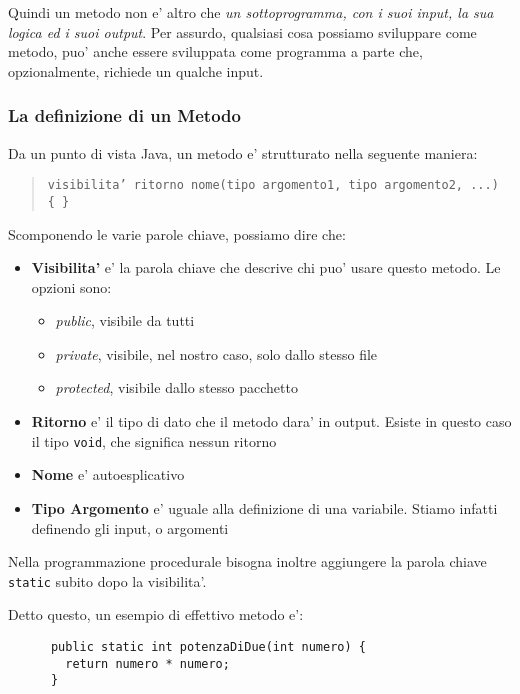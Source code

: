 \documentclass{article}
\begin{document}
{    Quindi un metodo non e' altro che \textit{un sottoprogramma, con i suoi input, la sua logica ed i suoi output}. Per assurdo, qualsiasi cosa possiamo sviluppare come metodo, puo' anche essere sviluppata come programma a parte che, opzionalmente, richiede un qualche input.

    \subsubsection{La definizione di un Metodo} %
    Da un punto di vista Java, un metodo e' strutturato nella seguente maniera:

    \begin{quote}
      \texttt{visibilita' ritorno nome(tipo argomento1, tipo argomento2, ...) \{ \}}
    \end{quote}

    Scomponendo le varie parole chiave, possiamo dire che:

    \begin{itemize}
      \item \textbf{Visibilita'} e' la parola chiave che descrive chi puo' usare questo metodo. Le opzioni sono:
      \begin{itemize}
        \item \textit{public}, visibile da tutti
        \item \textit{private}, visibile, nel nostro caso, solo dallo stesso file
        \item \textit{protected}, visibile dallo stesso pacchetto
      \end{itemize}
      \item \textbf{Ritorno} e' il tipo di dato che il metodo dara' in output. Esiste in questo caso il tipo \texttt{void}, che significa nessun ritorno
      \item \textbf{Nome} e' autoesplicativo
      \item \textbf{Tipo Argomento} e' uguale alla definizione di una variabile. Stiamo infatti definendo gli input, o argomenti
    \end{itemize}

    Nella programmazione procedurale bisogna inoltre aggiungere la parola chiave \texttt{static} subito dopo la visibilita'.

    Detto questo, un esempio di effettivo metodo e':

    \begin{verbatim}
      public static int potenzaDiDue(int numero) {
        return numero * numero;
      }
    \end{verbatim}

}
\end{document}
